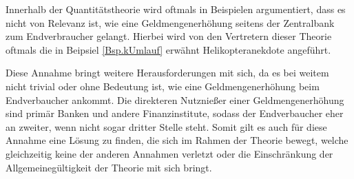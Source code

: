 Innerhalb der Quantitätstheorie wird oftmals in Beispielen argumentiert, dass es nicht von Relevanz ist, wie eine Geldmengenerhöhung seitens der Zentralbank zum Endverbraucher gelangt. Hierbei wird von den Vertretern dieser Theorie oftmals die in Beipsiel \vref{Bsp.kUmlauf} erwähnt Helikopteranekdote angeführt.


Diese Annahme bringt weitere Herausforderungen mit sich, da es bei weitem nicht trivial oder ohne Bedeutung ist, wie eine Geldmengenerhöhung beim Endverbaucher ankommt. Die direkteren Nutznießer einer Geldmengenerhöhung sind primär Banken und andere Finanzinstitute, sodass der Endverbaucher eher an zweiter, wenn nicht sogar dritter Stelle steht. Somit gilt es auch für diese Annahme eine Lösung zu finden, die sich im Rahmen der Theorie bewegt, welche gleichzeitig keine der anderen Annahmen verletzt oder die Einschränkung der Allgemeinegültigkeit der Theorie mit sich bringt.